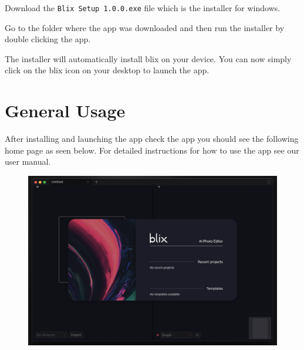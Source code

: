 \documentclass[11pt,a4paper]{article}
\def\code#1{\texttt{#1}}
\begin{document}
\begin{enumerate}[label*=\arabic*.]
	Download the \code{Blix Setup 1.0.0.exe} file which is the installer for windows.

	Go to the folder where the app was downloaded and then run the installer
	by double clicking the app.

	The installer will automatically install blix on your device. 
	You can now simply click on the blix icon on your desktop to launch the app.

\end{enumerate}

\section*{General Usage}

After installing and launching the app check the app you should see the
following home page as seen below. For detailed instructions for how to use the
app see our user manual.

\begin{figure}[ht]
	\centering
	\includegraphics[width=1\textwidth,height=\textheight,keepaspectratio,rotate=0,origin=c]{../pics/blix-homepage.png}
\end{figure}
\end{document}
